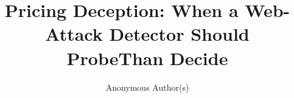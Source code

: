 \documentclass[runningheads]{llncs}
\begin{document}
\title{Pricing Deception: When a Web-Attack Detector Should Probe\Rather Than Decide}

\author{Anonymous Author(s)}


\maketitle

















\end{document}

